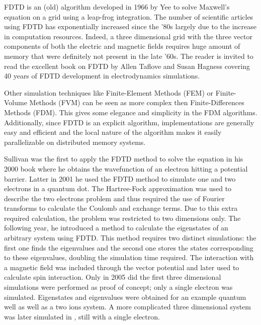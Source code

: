 FDTD is an (old) algorithm developed in 1966 by Yee\cite{Yee1966} to solve
Maxwell's equation on a grid using a leap-frog integration. The number of
scientific articles using FDTD has exponentially increased since the '80s
largely due to the increase in computation resources. Indeed, a three
dimensional grid with the three vector components of both the electric and
magnetic fields requires huge amount of memory that were definitely not present
in the late '60s. The reader is invited to read the excellent book on FDTD by
Allen Taflove and Susan Hagness\cite{Taflove2005} covering 40 years of FDTD
development in electrodynamics simulations.

Other simulation techniques like Finite-Element Methods (FEM) or Finite-Volume
Methods (FVM) can be seen as more complex then Finite-Differences Methods
(FDM). This gives some elegance and simplicity in the FDM algorithms.
Additionally, since FDTD is an explicit algorithm, implementations are
generally easy and efficient and the local nature of the algorithm makes it
easily parallelizable on distributed memory systems.

Sullivan was the first to apply the FDTD method to solve the \schrodinger
equation in his 2000 book\cite{Sullivan2000} where he obtains the wavefunction
of an electron hitting a potential barrier. Latter in 2001 he used the FDTD
method to simulate one and two electrons in a quantum dot\cite{Sullivan2001}.
The Hartree-Fock approximation was used to describe the two electrons problem
and thus required the use of Fourier transforms to calculate the Coulomb
and exchange terms. Due to this extra required calculation, the problem was
restricted to two dimensions only. The following year, he introduced a method
to calculate the eigenstates of an arbitrary system using
FDTD\cite{Sullivan2002}. This method requires two distinct simulations: the
first one finds the eigenvalues and the second one stores the states
corresponding to these eigenvalues, doubling the simulation time required.
The interaction with a magnetic field was included through the vector potential
and later\cite{Sullivan2003,Sullivan2004} used to calculate spin interaction.
Only in 2005 did the first three dimensional
simulations\cite{Sullivan2005a} were performed as proof of concept; only a
single electron was simulated. Eigenstates and eigenvalues were obtained for an
example quantum well as well as a two ions system. A more complicated three
dimensional system was later simulated in \cite{Sullivan2005b}, still with a
single electron.

